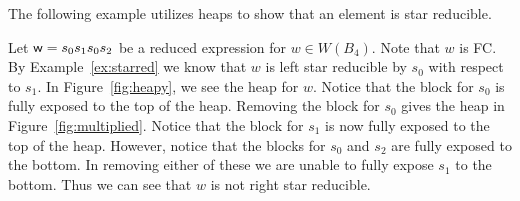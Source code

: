The following example utilizes heaps to show that an element is star reducible.

\begin{example}\label{ex:starredheap}
Let $\mathsf{w}=s_0s_1s_0s_2$ be a reduced expression for $w \in W(B_4)$. Note that $w$ is FC. By Example~\ref{ex:starred} we know that $w$ is left star reducible by $s_0$ with respect to $s_1$. In Figure~\ref{fig:heapy}, we see the heap for $w$. Notice that the block for $s_0$ is fully exposed to the top of the heap. Removing the block for $s_0$ gives the heap in Figure~\ref{fig:multiplied}. Notice that the block for $s_1$ is now fully exposed to the top of the heap. However, notice that the blocks for $s_0$ and $s_2$ are fully exposed to the bottom. In removing either of these we are unable to fully expose $s_1$ to the bottom. Thus we can see that $w$ is not right star reducible.  
\end{example}




